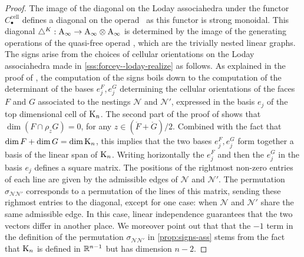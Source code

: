 \documentclass[twoside, 11pt]{amsart}
\theoremstyle{remark}
\begin{document}
\begin{proof}
The image of the diagonal on the Loday associahedra under the functor $C_\bullet^{\mathrm{cell}}$ defines a diagonal on the operad \Ainf\ as this functor is strong monoidal. 
This diagonal $\triangle^{K} : \mathrm{A}_\infty \rightarrow \mathrm{A}_\infty \otimes \mathrm{A}_\infty$ is determined by the image of the generating operations of the quasi-free operad \Ainf , which are the trivially nested linear graphs. 
The signs arise from the choices of cellular orientations on the Loday associahedra made in \cref{sss:forcey--loday-realize} as follows. 
As explained in the proof of \cite[Proposition 4.27]{LA21}, the computation of the signs boils down to the computation of the determinant of the bases $e_j^{F}, e_j^{G}$ determining the cellular orientations of the faces $F$ and $G$ associated to the nestings $\mathcal{N}$ and $\mathcal{N}'$, expressed in the basis $e_j$ of the top dimensional cell of $\mathrm{K}_n$. 
The second part of the proof of \cite[Theorem 1.26]{LA21} shows that  $\dim(F\cap \rho_z G)=0$, for any $z \in (\mathring F+ \mathring G)/2$.
Combined with the fact that $\dim F + \dim G = \dim \mathrm{K}_n$, this implies that the two bases $e_j^F, e_j^G$ form together a basis of the linear span of $\mathrm{K}_n$. 
Writing horizontally the $e_j^F$ and then the $e_j^G$ in the basis $e_j$ defines a square matrix.
The positions of the rightmost non-zero entries of each line are given by the admissible edges of $\mathcal{N}$ and $\mathcal{N}'$. 
The permutation $\sigma_{\mathcal{N}\mathcal{N}'}$ corresponds to a permutation of the lines of this matrix, sending these righmost entries to the diagonal, except for one case: when $\mathcal{N}$ and $\mathcal{N}'$ share the same admissible edge. 
In this case, linear independence guarantees that the two vectors differ in another place.
We moreover point out that that the $-1$ term in the definition of the permutation $\sigma_{\mathcal{N}\mathcal{N}'}$ in \cref{prop:signs-ass} stems from the fact that $\mathrm{K}_n$ is defined in $\mathbb{R}^{n-1}$ but has dimension $n-2$. 
\end{proof}
\end{document}
